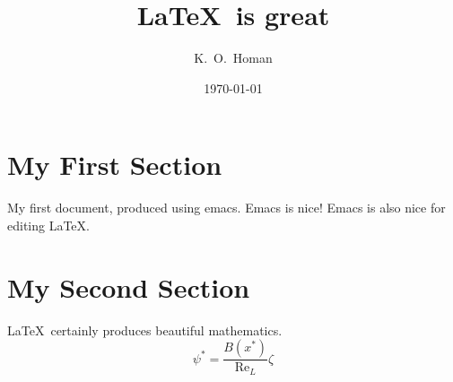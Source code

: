 \documentclass{article}
\begin{document}
\title{\LaTeX\ is great}
\author{K.\ O.\ Homan}
\date{\today}
\maketitle

\section{My First Section}

My first document, produced using emacs.  Emacs is nice!
Emacs is also nice for editing \LaTeX.

\section{My Second Section}

\LaTeX\ certainly  produces beautiful mathematics.
\begin{equation}
\psi^\ast = \frac{B(x^\ast)}{\mathrm{Re}_L}\zeta
\end{equation}
\end{document}
